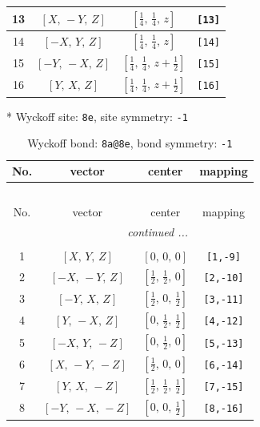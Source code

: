 \documentclass[fleqn,8pt]{jsarticle}
\begin{document}
\begin{longtable}{cccc}
13 & $\left[ X,\, - Y,\, Z \right]$ & $\left[ \frac{1}{4},\, \frac{1}{4},\, z \right]$ & {\tt [13]} \\ \hline
14 & $\left[ - X,\, Y,\, Z \right]$ & $\left[ \frac{1}{4},\, \frac{1}{4},\, z \right]$ & {\tt [14]} \\ \hline
15 & $\left[ - Y,\, - X,\, Z \right]$ & $\left[ \frac{1}{4},\, \frac{1}{4},\, z + \frac{1}{2} \right]$ & {\tt [15]} \\ \hline
16 & $\left[ Y,\, X,\, Z \right]$ & $\left[ \frac{1}{4},\, \frac{1}{4},\, z + \frac{1}{2} \right]$ & {\tt [16]} \\
\end{longtable}
* Wyckoff site: {\tt 8e}, site symmetry: {\tt -1}
\renewcommand{\arraystretch}{1.2}
\begin{longtable}{cccc}
\caption{Wyckoff bond: {\tt 8a@8e}, bond symmetry: {\tt -1}}
 \\
 \hline \hline
No. & vector & center & mapping \\ \hline \endfirsthead

\multicolumn{3}{l}{\tablename\ \thetable{}} \\
 \hline \hline
No. & vector & center & mapping \\ \hline \endhead

 \hline \hline
\multicolumn{3}{r}{\footnotesize\it continued ...} \\ \endfoot

 \hline \hline
\multicolumn{3}{r}{} \\ \endlastfoot

1 & $\left[ X,\, Y,\, Z \right]$ & $\left[ 0,\, 0,\, 0 \right]$ & {\tt [1,-9]} \\ \hline
2 & $\left[ - X,\, - Y,\, Z \right]$ & $\left[ \frac{1}{2},\, \frac{1}{2},\, 0 \right]$ & {\tt [2,-10]} \\ \hline
3 & $\left[ - Y,\, X,\, Z \right]$ & $\left[ \frac{1}{2},\, 0,\, \frac{1}{2} \right]$ & {\tt [3,-11]} \\ \hline
4 & $\left[ Y,\, - X,\, Z \right]$ & $\left[ 0,\, \frac{1}{2},\, \frac{1}{2} \right]$ & {\tt [4,-12]} \\ \hline
5 & $\left[ - X,\, Y,\, - Z \right]$ & $\left[ 0,\, \frac{1}{2},\, 0 \right]$ & {\tt [5,-13]} \\ \hline
6 & $\left[ X,\, - Y,\, - Z \right]$ & $\left[ \frac{1}{2},\, 0,\, 0 \right]$ & {\tt [6,-14]} \\ \hline
7 & $\left[ Y,\, X,\, - Z \right]$ & $\left[ \frac{1}{2},\, \frac{1}{2},\, \frac{1}{2} \right]$ & {\tt [7,-15]} \\ \hline
8 & $\left[ - Y,\, - X,\, - Z \right]$ & $\left[ 0,\, 0,\, \frac{1}{2} \right]$ & {\tt [8,-16]} \\
\end{longtable}
\end{document}
